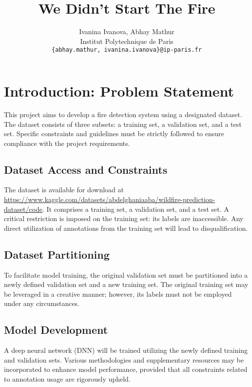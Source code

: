 \documentclass{article}
\title{We Didn't Start The Fire
}
\author{
  Ivanina Ivanova, Abhay Mathur \\
  Institut Polytechnique de Paris \\
  \texttt{\{abhay.mathur, ivanina.ivanova\}@ip-paris.fr} \\
}
\begin{document}
\maketitle

\begin{abstract}
  \lipsum[1]
\end{abstract}


\section{Introduction: Problem Statement}
This project aims to develop a fire detection system using a designated
dataset. The dataset consists of three subsets: a training set, a validation
set, and a test set. Specific constraints and guidelines must be strictly
followed to ensure compliance with the project requirements.

\subsection{Dataset Access and Constraints}

The dataset is available for download at
\url{https://www.kaggle.com/datasets/abdelghaniaaba/wildfire-prediction-dataset/code}.
It comprises a training set, a validation set, and a test set. A critical
restriction is imposed on the training set: its labels are inaccessible. Any
direct utilization of annotations from the training set will lead to
disqualification.

\subsection{Dataset Partitioning}

To facilitate model training, the original validation set must be partitioned
into a newly defined validation set and a new training set. The original
training set may be leveraged in a creative manner; however, its labels must
not be employed under any circumstances.

\subsection{Model Development}

A deep neural network (DNN) will be trained utilizing the newly defined
training and validation sets. Various methodologies and supplementary resources
may be incorporated to enhance model performance, provided that all constraints
related to annotation usage are rigorously upheld.
\end{document}

